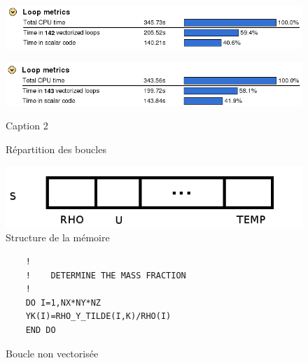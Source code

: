 \begin{figure}	
  \centering
  \begin{minipage}{.5\textwidth}
    \centering
    \includegraphics[width=.9\linewidth]{figures/advixe_O2.png}
    \caption{\label{fig:advixe_o2}}
  \end{minipage}%
  \begin{minipage}{.5\textwidth}
    \centering
    \includegraphics[width=.9\linewidth]{figures/advixe_O2_avx.png}
    \caption{\label{fig:advixe_o2_avx}Caption 2}
  \end{minipage}
  \caption{Répartition des boucles}\label{fig:advixe}
\end{figure}

\begin{figure}[ht]
  \centering
  \includegraphics[scale=0.35]{figures/array_s.png}
  \caption{\label{fig:array_s}Structure de la mémoire}
\end{figure}


\begin{figure}[h]
  \centering
  \begin{lstlisting}
    !
    !    DETERMINE THE MASS FRACTION
    !
    DO I=1,NX*NY*NZ
    YK(I)=RHO_Y_TILDE(I,K)/RHO(I)
    END DO
  \end{lstlisting}
  \caption{\label{fig:o2_avx_novect}Boucle non vectorisée}
\end{figure}



